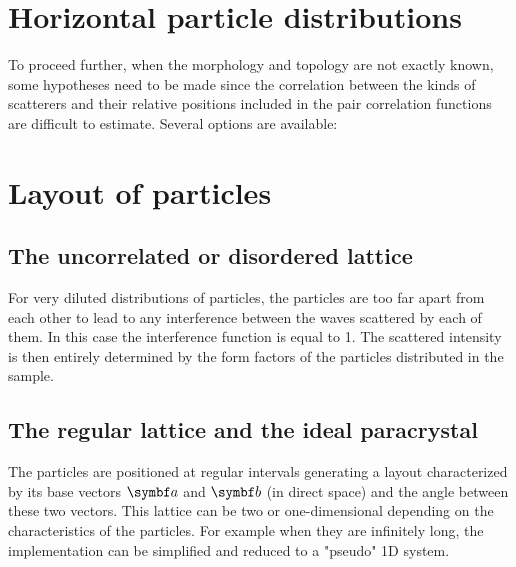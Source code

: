 \section{Horizontal particle distributions}

To proceed further, when the morphology and topology are not exactly known,
some hypotheses need to be made since the correlation between the kinds of scatterers
and their relative positions included in the pair correlation functions are difficult to estimate.
Several options are available:



\section{Layout of particles}\label{sec:partlayout}

\subsection{The uncorrelated or disordered lattice}
For very diluted distributions of particles, the particles are too far apart from each other to lead to any interference between the waves scattered by each of them. In this case the interference function is equal to 1. The scattered intensity is then entirely determined by the form factors of the particles distributed in the sample.

\subsection{The regular lattice and the ideal paracrystal}
The particles are positioned at regular intervals generating a layout characterized by its base vectors $\v{a}$ and $\v{b}$ (in direct space) and the angle between these two vectors.
This lattice can be two or one-dimensional depending on the characteristics of the particles. For example when they are infinitely long, the implementation can be simplified and reduced to a "pseudo" 1D system.

